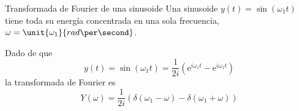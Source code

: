 \documentclass[presentation,aspectratio=169]{beamer}
\begin{document}
\begin{frame}[label={sec:org8d86474}]{Transformada de Fourier de una sinusoide}
Una sinusoide \(y(t) = \sin(\omega_1 t)\) tiene toda su energía concentrada en una sola frecuencia, \(\omega=\unit{\omega_1}{rad\per\second}\). 
\begin{center}
\end{center}
Dado de que \[y(t) = \sin(\omega_1 t) = \frac{1}{2i} \left( \mathrm{e}^{i\omega_1 t} - \mathrm{e}^{i \omega_1 t} \right)\]
la transformada de Fourier es
\[ Y(\omega) = \frac{1}{2i} \left( \delta(\omega_1 - \omega) - \delta(\omega_1 + \omega) \right)\]
\end{frame}
\end{document}
